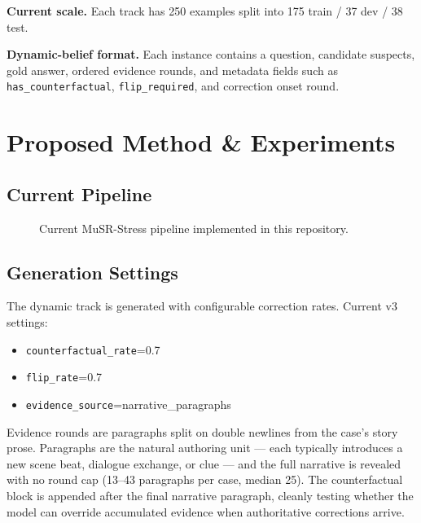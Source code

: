\documentclass{article}
\begin{document}
\textbf{Current scale.}
Each track has 250 examples split into 175 train / 37 dev / 38 test.

\textbf{Dynamic-belief format.}
Each instance contains a question, candidate suspects, gold answer, ordered evidence rounds, and metadata fields such as \texttt{has\_counterfactual}, \texttt{flip\_required}, and correction onset round.

\section{Proposed Method \& Experiments}
\subsection{Current Pipeline}
\begin{figure}[h]
\centering
{}
\caption{Current MuSR-Stress pipeline implemented in this repository.}
\label{fig:musr_stress_pipeline}
\end{figure}

\subsection{Generation Settings}
The dynamic track is generated with configurable correction rates. Current v3 settings:
\begin{itemize}
  \item \texttt{counterfactual\_rate}=0.7
  \item \texttt{flip\_rate}=0.7
  \item \texttt{evidence\_source}=narrative\_paragraphs
\end{itemize}

Evidence rounds are paragraphs split on double newlines from the case's story prose. Paragraphs are the natural authoring unit --- each typically introduces a new scene beat, dialogue exchange, or clue --- and the full narrative is revealed with no round cap (13--43 paragraphs per case, median 25). The counterfactual block is appended after the final narrative paragraph, cleanly testing whether the model can override accumulated evidence when authoritative corrections arrive.
\end{document}
